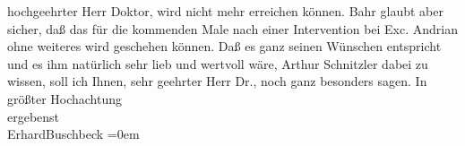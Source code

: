 \begin{ledgroupsized}[t]{13cm}
               hochgeehrter Herr Doktor, wird nicht mehr erreichen können. Bahr glaubt aber sicher, daß das für die kommenden Male nach
               einer Intervention bei Exc. Andrian ohne weiteres
               wird geschehen können. Daß es ganz seinen Wünschen entspricht und es ihm natürlich
               sehr lieb \introOben{}und wertvoll\introOben{} wäre, Arthur Schnitzler dabei zu
               wissen, soll ich Ihnen, sehr geehrter Herr Dr., noch ganz besonders sagen.\pend
           \pstart
           In größter Hochachtung{\\[\baselineskip]}ergebenst{\\[\baselineskip]}\spacefill\mbox{ErhardBuschbeck}\pend
           \leftskip=0em{}          \endnumbering{}\end{ledgroupsized}  \newcommand{\dateiname}{L02305}\newcommand{\titel}{Erhard Buschbeck an Arthur Schnitzler, 24. 9. 1918}\newcommand{\editorInnen}{ Martin Anton Müller und Gerd-Hermann Susen}
            \footnotesize
\begin{ledgroupsized}[t]{11.5cm}
\end{ledgroupsized}
         
      